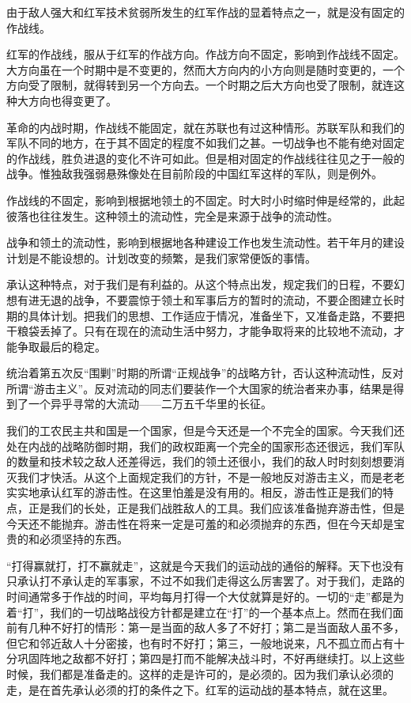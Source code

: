 由于敌人强大和红军技术贫弱所发生的红军作战的显着特点之一，就是没有固定的作战线。

红军的作战线，服从于红军的作战方向。作战方向不固定，影响到作战线不固定。大方向虽在一个时期中是不变更的，然而大方向内的小方向则是随时变更的，一个方向受了限制，就得转到另一个方向去。一个时期之后大方向也受了限制，就连这种大方向也得变更了。

革命的内战时期，作战线不能固定，就在苏联也有过这种情形。苏联军队和我们的军队不同的地方，在于其不固定的程度不如我们之甚。一切战争也不能有绝对固定的作战线，胜负进退的变化不许可如此。但是相对固定的作战线往往见之于一般的战争。惟独敌我强弱悬殊像处在目前阶段的中国红军这样的军队，则是例外。

作战线的不固定，影响到根据地领土的不固定。时大时小时缩时伸是经常的，此起彼落也往往发生。这种领土的流动性，完全是来源于战争的流动性。

战争和领土的流动性，影响到根据地各种建设工作也发生流动性。若干年月的建设计划是不能设想的。计划改变的频繁，是我们家常便饭的事情。

承认这种特点，对于我们是有利益的。从这个特点出发，规定我们的日程，不要幻想有进无退的战争，不要震惊于领土和军事后方的暂时的流动，不要企图建立长时期的具体计划。把我们的思想、工作适应于情况，准备坐下，又准备走路，不要把干粮袋丢掉了。只有在现在的流动生活中努力，才能争取将来的比较地不流动，才能争取最后的稳定。

统治着第五次反“围剿”时期的所谓“正规战争”的战略方针，否认这种流动性，反对所谓“游击主义”。反对流动的同志们要装作一个大国家的统治者来办事，结果是得到了一个异乎寻常的大流动——二万五千华里的长征。

我们的工农民主共和国是一个国家，但是今天还是一个不完全的国家。今天我们还处在内战的战略防御时期，我们的政权距离一个完全的国家形态还很远，我们军队的数量和技术较之敌人还差得远，我们的领土还很小，我们的敌人时时刻刻想要消灭我们才快活。从这个上面规定我们的方针，不是一般地反对游击主义，而是老老实实地承认红军的游击性。在这里怕羞是没有用的。相反，游击性正是我们的特点，正是我们的长处，正是我们战胜敌人的工具。我们应该准备抛弃游击性，但是今天还不能抛弃。游击性在将来一定是可羞的和必须抛弃的东西，但在今天却是宝贵的和必须坚持的东西。

“打得赢就打，打不赢就走”，这就是今天我们的运动战的通俗的解释。天下也没有只承认打不承认走的军事家，不过不如我们走得这么厉害罢了。对于我们，走路的时间通常多于作战的时间，平均每月打得一个大仗就算是好的。一切的“走”都是为着“打”，我们的一切战略战役方针都是建立在“打”的一个基本点上。然而在我们面前有几种不好打的情形：第一是当面的敌人多了不好打；第二是当面敌人虽不多，但它和邻近敌人十分密接，也有时不好打；第三，一般地说来，凡不孤立而占有十分巩固阵地之敌都不好打；第四是打而不能解决战斗时，不好再继续打。以上这些时候，我们都是准备走的。这样的走是许可的，是必须的。因为我们承认必须的走，是在首先承认必须的打的条件之下。红军的运动战的基本特点，就在这里。

